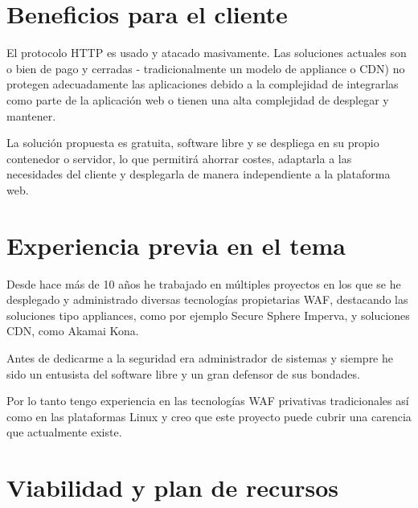\section{Beneficios para el cliente}

\par El protocolo HTTP es usado y atacado masivamente. Las soluciones actuales son o bien de pago y cerradas -
tradicionalmente un modelo de appliance o CDN) no protegen adecuadamente las a\-pli\-ca\-cio\-nes debido a la complejidad de
integrarlas como parte de la aplicación web o tienen una alta complejidad de desplegar y mantener.
\par La solución propuesta es gratuita, software libre y se despliega en su propio contenedor o servidor, lo
que permitirá ahorrar costes, adaptarla a las necesidades del cliente y desplegarla de manera in\-de\-pen\-dien\-te a la
plataforma web.

\section{Experiencia previa en el tema}
\par Desde hace más de 10 años he trabajado en múltiples proyectos en los que se he desplegado y administrado
diversas tecnologías propietarias WAF, destacando las soluciones tipo appliances, como por ejemplo Secure Sphere
Imperva, y soluciones CDN, como Akamai Kona.
\par Antes de dedicarme a la seguridad era administrador de sistemas y siempre he sido un entusista del software
libre y un gran defensor de sus bondades.
\par Por lo tanto tengo experiencia en las tecnologías WAF privativas tradicionales así como en las plataformas
Linux y creo que este proyecto puede cubrir una carencia que actualmente existe.

\section{Viabilidad y plan de recursos}
